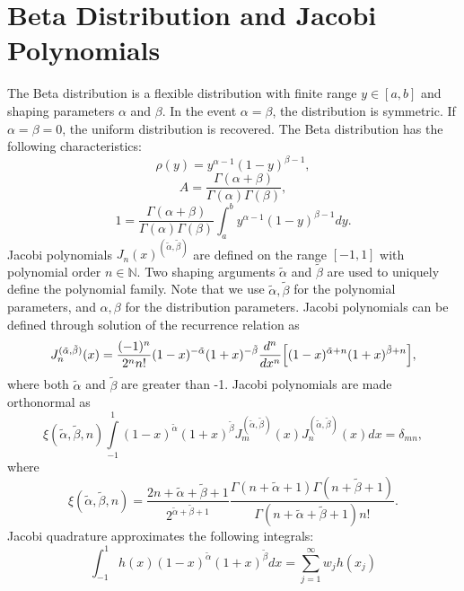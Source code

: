 \section{Beta Distribution and Jacobi Polynomials}
The Beta distribution is a flexible distribution with finite range $y\in[a,b]$ and shaping parameters $\alpha$
and $\beta$.  In the event $\alpha=\beta$, the distribution is symmetric.  If $\alpha=\beta=0$, the uniform
distribution is recovered.  The Beta distribution has the
following characteristics:
\begin{equation}
  \rho(y) = y^{\alpha-1}(1-y)^{\beta-1},
\end{equation}
\begin{equation}
  A =\frac{ \Gamma(\alpha+\beta)}{\Gamma(\alpha)\Gamma(\beta)},
\end{equation}
\begin{equation}
  1 = \frac{ \Gamma(\alpha+\beta)}{\Gamma(\alpha)\Gamma(\beta)}\int_a^b y^{\alpha-1}(1-y)^{\beta-1} dy.
\end{equation}
Jacobi polynomials $J_n(x)^{(\tilde\alpha,\tilde\beta)}$ are defined on the range $[-1,1]$ with polynomial
order $n\in\mathbb{N}$.  Two shaping arguments $\tilde\alpha$ and $\tilde\beta$ are used to uniquely define the
polynomial family.
Note that we use $\tilde\alpha,\tilde\beta$ for the polynomial parameters, and $\alpha,\beta$ for the
distribution parameters.
Jacobi polynomials can be defined through solution of the recurrence relation as
\begin{equation}
  J_n^{(\tilde\alpha,\tilde\beta)}(x) = \frac{(-1)^n}{2^n n!}(1-x)^{-\tilde\alpha}(1+x)^{-\tilde\beta}
  \frac{d^n}{d x^n}\qty[(1-x)^{\tilde\alpha+n}(1+x)^{\tilde\beta+n}],
\end{equation}
where both $\tilde\alpha$ and $\tilde\beta$ are greater than -1.  Jacobi polynomials are made orthonormal as
\begin{equation}
  \xi(\tilde\alpha,\tilde\beta,n)\int\limits_{-1}^1(1-x)^{\tilde\alpha}(1+x)^{\tilde\beta}
    J_m^{(\tilde\alpha,\tilde\beta)}(x)J_n^{(\tilde\alpha,\tilde\beta)}(x)dx = \delta_{mn},
\end{equation}
where
\begin{equation}
  \xi(\tilde\alpha,\tilde\beta,n) = \frac{2n+\tilde\alpha+\tilde\beta+1}{2^{\tilde\alpha+\tilde\beta+1}}
      \frac{\Gamma(n+\tilde\alpha+1)\Gamma(n+\tilde\beta+1)}{\Gamma(n+\tilde\alpha+\tilde\beta+1)n!}.
\end{equation}
Jacobi quadrature approximates the following integrals:
\begin{equation}
  \int_{-1}^1 h(x)(1-x)^{\tilde\alpha} (1+x)^{\tilde\beta} dx = \sum_{j=1}^\infty w_j h(x_j)
\end{equation}
